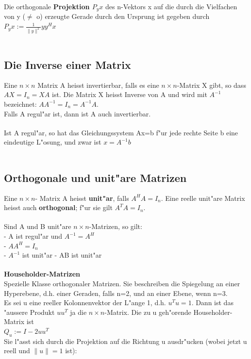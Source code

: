 \documentclass[10pt, a4paper, twocolumn]{scrartcl}
\begin{document}
Die orthogonale {\bf Projektion $P_yx$} des n-Vektors x auf die durch die Vielfachen von y ($\neq$ o) erzeugte Gerade durch den Ursprung ist gegeben durch {\bf $P_yx:=\frac{1}{\|y\|^2}yy^Hx$}\\\\

\subsection{Die Inverse einer Matrix}

Eine $n\times n$ Matrix A heisst invertierbar, falls es eine $n\times n$-Matrix X gibt, so dass $AX=I_n=XA$ ist. Die Matrix X heisst Inverse von A und wird mit $A^{-1}$ bezeichnet: $AA^{-1}=I_n=A^{-1}A$.\\
Falls A regul"ar ist, dann ist A auch invertierbar.\\\\

Ist A regul"ar, so hat das Gleichungssystem Ax=b f"ur jede rechte Seite b eine eindeutige L"osung, und zwar ist $x=A^{-1}b$\\\\

\subsection{Orthogonale und unit"are Matrizen}

Eine $n\times n$- Matrix A heisst {\bf unit"ar}, falls $A^HA=I_n$. Eine reelle unit"are Matrix heisst auch {\bf orthogonal}; f"ur sie gilt $A^TA=I_n$.\\\\
Sind A und B unit"are $n\times n$-Matrizen, so gilt:\\
- A ist regul"ar und $A^{-1}=A^H$\\
- $AA^H=I_n$\\
- $A^{-1}$ ist unit"ar
- AB ist unit"ar\\\\

{\bf Householder-Matrizen}\\
Spezielle Klasse orthogonaler Matrizen. Sie beschreiben die Spiegelung an einer Hyperebene, d.h. einer Geraden, falls n=2, und an einer Ebene, wenn n=3.\\
Es sei u eine reeller Kolonnenvektor der L"ange 1, d.h. $u^Tu=1$. Dann ist das "aussere Produkt $uu^T$ ja die $n\times n$-Matrix. Die zu u geh"orende Householder-Matrix ist \\
{\bf $Q_u:=I-2uu^T$}\\
Sie l"asst sich durch die Projektion auf die Richtung u ausdr"ucken (wobei jetzt u reell und $\|u\|=1$ ist):\\
\end{document}
